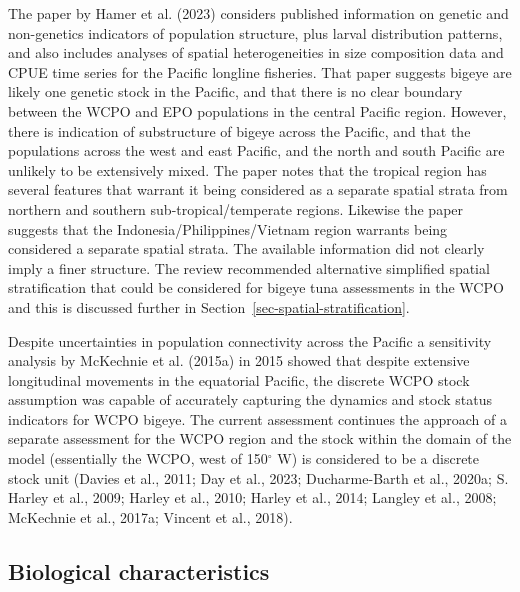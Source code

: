 \documentclass[
  english,
  a4paper,
  a4paper,
  11pt]{SCreport}
\begin{document}
The paper by Hamer et al. (2023) considers published information on
genetic and non-genetics indicators of population structure, plus larval
distribution patterns, and also includes analyses of spatial
heterogeneities in size composition data and CPUE time series for the
Pacific longline fisheries. That paper suggests bigeye are likely one
genetic stock in the Pacific, and that there is no clear boundary
between the WCPO and EPO populations in the central Pacific region.
However, there is indication of substructure of bigeye across the
Pacific, and that the populations across the west and east Pacific, and
the north and south Pacific are unlikely to be extensively mixed. The
paper notes that the tropical region has several features that warrant
it being considered as a separate spatial strata from northern and
southern sub-tropical/temperate regions. Likewise the paper suggests
that the Indonesia/Philippines/Vietnam region warrants being considered
a separate spatial strata. The available information did not clearly
imply a finer structure. The review recommended alternative simplified
spatial stratification that could be considered for bigeye tuna
assessments in the WCPO and this is discussed further in
Section~\ref{sec-spatial-stratification}.

Despite uncertainties in population connectivity across the Pacific a
sensitivity analysis by McKechnie et al. (2015a) in 2015 showed that
despite extensive longitudinal movements in the equatorial Pacific, the
discrete WCPO stock assumption was capable of accurately capturing the
dynamics and stock status indicators for WCPO bigeye. The current
assessment continues the approach of a separate assessment for the WCPO
region and the stock within the domain of the model (essentially the
WCPO, west of 150\(^\circ\) W) is considered to be a discrete stock unit
(Davies et al., 2011; Day et al., 2023; Ducharme-Barth et al., 2020a; S.
Harley et al., 2009; Harley et al., 2010; Harley et al., 2014; Langley
et al., 2008; McKechnie et al., 2017a; Vincent et al., 2018).

\subsection{Biological characteristics}\label{sec-biology}
\end{document}
